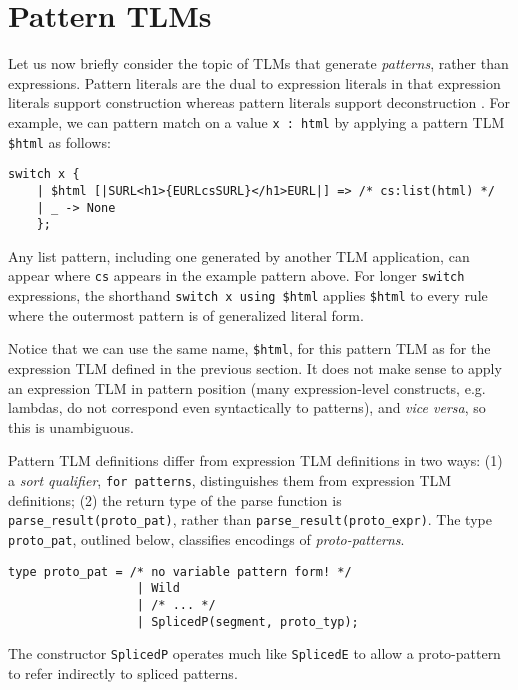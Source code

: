 \documentclass[acmsmall,review,anonymous]{acmart}\settopmatter{printfolios=true,printccs=false,printacmref=false}
\newcommand{\li}[1]{\lstinline[basicstyle=\ttfamily\fontsize{9pt}{1em}\selectfont]{#1}}
\begin{document}
\newcommand{\spTLMsSec}{Pattern TLMs}
\section{\protect\spTLMsSec}
\label{sec:sptsms}

Let us now briefly consider the topic of TLMs that generate \emph{patterns}, rather than expressions. Pattern literals are the dual to expression literals in that expression literals support construction whereas pattern literals support deconstruction \cite{moriconi2008inversion}. For example, we can pattern match on a value \li{x : html} by applying a pattern TLM \li{$html} as follows:
\begin{lstlisting}[numbers=none]
    switch x {
    | $html [|SURL<h1>{EURLcsSURL}</h1>EURL|] => /* cs:list(html) */
    | _ -> None
    };
\end{lstlisting}
Any list pattern, including one generated by another TLM application, can appear where \li{cs} appears in the example pattern above. For longer \li{switch} expressions, the shorthand \li{switch x using $html} applies \li{$html} to every rule where the outermost pattern is of generalized literal form.

Notice that we can use the same name, \li{$html}, for this pattern TLM as for the expression TLM defined in the previous section. It does not make sense to apply an expression TLM in pattern position  (many expression-level constructs, e.g. lambdas, do not correspond even syntactically to patterns), and \emph{vice versa}, so this is unambiguous.

Pattern TLM definitions differ from expression TLM definitions in two ways: (1) a \emph{sort qualifier}, \li{for patterns}, distinguishes them from expression TLM definitions; (2) the return type of the parse function is \li{parse_result(proto_pat)}, rather than \li{parse_result(proto_expr)}. The type \li{proto_pat}, outlined below, classifies encodings of \emph{proto-patterns}.
\begin{lstlisting}[numbers=none]
   type proto_pat = /* no variable pattern form! */
                  | Wild
                  | /* ... */
                  | SplicedP(segment, proto_typ);
\end{lstlisting}

The constructor \li{SplicedP} operates much like \li{SplicedE} to allow a proto-pattern to refer indirectly to spliced patterns.%
\end{document}
